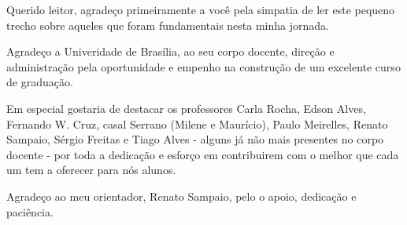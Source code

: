 \begin{agradecimentos}
    Querido leitor, agradeço primeiramente a você pela simpatia de
    ler este pequeno trecho sobre aqueles que foram fundamentais
    nesta minha jornada.

    Agradeço a Univeridade de Brasília, ao seu corpo docente, direção
    e administração pela oportunidade e empenho na construção de um
    excelente curso de graduação.

    Em especial gostaria de destacar os professores Carla Rocha, Edson
    Alves, Fernando W. Cruz, casal Serrano (Milene e Maurício), Paulo
    Meirelles, Renato Sampaio, Sérgio Freitas e Tiago Alves - alguns já
    não mais presentes no corpo docente - por toda a dedicação e esforço
    em contribuirem com o melhor que cada um tem a oferecer para nós alunos.

    Agradeço ao meu orientador, Renato Sampaio, pelo o apoio, dedicação e
    paciência.
\end{agradecimentos}
